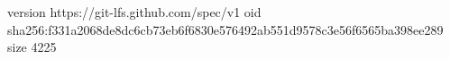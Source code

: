version https://git-lfs.github.com/spec/v1
oid sha256:f331a2068de8dc6cb73eb6f6830e576492ab551d9578c3e56f6565ba398ee289
size 4225
